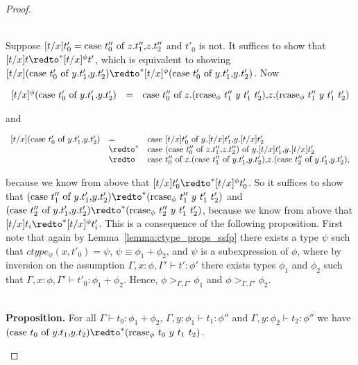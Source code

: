 \begin{proof}
\begin{itemize}
  \ \\
  Suppose $[t/x]t'_0 = \mbox{case}\ t''_0\ \text{of}\ z\text{.}t''_1\text{,}z\text{.}t''_2$ and $t'_0$ is not.  It suffices to show that 
  $[t/x]t \redto^* [t/x]^\phi t'$, which is equivalent to showing 
  $[t/x](\ccon{t'_0}{y}{t'_1}{t'_2}) \redto^* [t/x]^\phi (\ccon{t'_0}{y}{t'_1}{t'_2})$.  Now
  \begin{center}
    \begin{math}
      \begin{array}{lll}
        [t/x]^\phi (\mbox{case}\ t'_0\ \text{of}\ y\text{.}t'_1\text{,}y\text{.}t'_2) & = &
        \mbox{case}\ t''_0\ \text{of}\ z\text{.}(\mbox{rcase}_{\phi}\ t''_1\ y\ t'_1\ t'_2)\text{,}z\text{.}(\mbox{rcase}_{\phi}\ t''_1\ y\ t'_1\ t'_2)
      \end{array}
    \end{math}
  \end{center}
  and
  \begin{center}
    \begin{math}
      \begin{array}{lll}
        [t/x] (\ccon{t'_0}{y}{t'_1}{t'_2}) & = & \ccon{[t/x]t'_0}{y}{[t/x]t'_1}{[t/x]t'_2} \\
        & \redto^* & \ccon{(\ccon{t''_0}{z}{t''_1}{t''_2})}{y}{[t/x]t'_1}{[t/x]t'_2} \\
        & \redto & \ccon{t''_0}{z}{(\ccon{t''_1}{y}{t'_1}{t'_2})}{(\ccon{t''_2}{y}{t'_1}{t'_2})},
      \end{array}
    \end{math}
  \end{center}
  because we know from above that $[t/x]t'_0 \redto^* [t/x]^\phi t'_0$.  So it suffices to show that
  $(\ccon{t''_1}{y}{t'_1}{t'_2}) \redto^* (\rcase{\phi}{t''_1}{y}{t'_1}{t'_2})$ and
  $(\ccon{t''_2}{y}{t'_1}{t'_2}) \redto^* (\rcase{\phi}{t''_2}{y}{t'_1}{t'_2})$, because we know from above that 
  $[t/x]t_i \redto^* [t/x]^\phi t'_i$.  This is a consequence of the following proposition.  First note that 
  again by Lemma~\ref{lemma:ctype_props_ssfp} there exists a type $\psi$ such that $ctype_\phi(x,t'_0) = \psi$,
  $\psi \equiv \phi_1+\phi_2$, and $\psi$ is a subexpression of $\phi$, where by inversion on the assumption
  $\Gamma,x:\phi,\Gamma' \vdash t':\phi'$ there exists types $\phi_1$ and $\phi_2$ such that 
  $\Gamma,x:\phi,\Gamma' \vdash t'_0:\phi_1+\phi_2$.  Hence, $\phi >_{\Gamma,\Gamma'} \phi_1$ and
  $\phi >_{\Gamma,\Gamma'} \phi_2$.  
  
  \ \\
  {\bf Proposition.} For all $\Gamma \vdash t_0:\phi_1+\phi_2$, $\Gamma,y:\phi_1 \vdash t_1:\phi''$ and
  $\Gamma,y:\phi_2 \vdash t_2:\phi''$ we have 
  $(\ccon{t_0}{y}{t_1}{t_2}) \redto^* (\rcase{\phi}{t_0}{y}{t_1}{t_2})$.
  

\end{itemize}
\end{proof}
